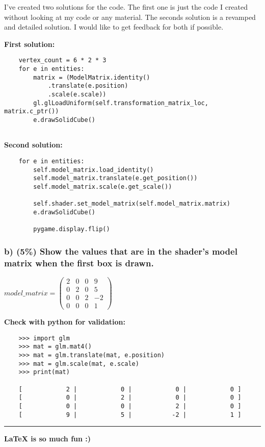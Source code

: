 I've created two solutions for the code. The first one is just the code I created without looking at my code or any material. The seconds solution is a revamped and detailed solution. I would like to get feedback for both if possible.

\textbf{First solution:}
\begin{verbatim}
    vertex_count = 6 * 2 * 3
    for e in entities:
        matrix = (ModelMatrix.identity()
            .translate(e.position)
            .scale(e.scale))
        gl.glLoadUniform(self.transformation_matrix_loc, matrix.c_ptr())
        e.drawSolidCube()
    
\end{verbatim}

\textbf{Second solution:}
\begin{verbatim}
    for e in entities:
        self.model_matrix.load_identity()
        self.model_matrix.translate(e.get_position())
        self.model_matrix.scale(e.get_scale())

        self.shader.set_model_matrix(self.model_matrix.matrix)
        e.drawSolidCube()

        pygame.display.flip()

\end{verbatim}

\subsubsection{b)  (5\%) Show the values that are in the shader’s model matrix when the first box is drawn.}

$ model\_matrix = \left(\begin{array}{cccc}2&0&0&9\\0&2&0&5\\0&0&2&-2\\0&0&0&1\end{array}\right) $

\textbf{Check with python for validation:}
\begin{verbatim}
    >>> import glm
    >>> mat = glm.mat4()
    >>> mat = glm.translate(mat, e.position)
    >>> mat = glm.scale(mat, e.scale)
    >>> print(mat)
    
    [            2 |            0 |            0 |            0 ]
    [            0 |            2 |            0 |            0 ]
    [            0 |            0 |            2 |            0 ]
    [            9 |            5 |           -2 |            1 ]
\end{verbatim}
\rule{\textwidth}{0.2mm}

\textbf{LaTeX is so much fun :)}